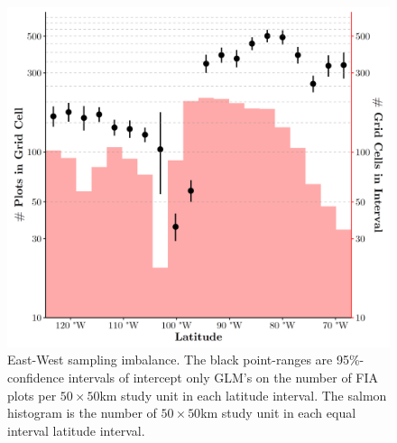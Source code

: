 \documentclass[
  10pt,
]{article}
\begin{document}
\begin{figure}
  \centering
  \includegraphics[width=\textwidth]{../Final Visualizations/eastWestSampling.png}
  \caption{East-West sampling imbalance. The black point-ranges are 95\%-confidence intervals of intercept only GLM's on the number of FIA plots per $50 \times 50$km study unit in each latitude interval. The salmon histogram is the number of $50 \times 50$km study unit in each equal interval latitude interval.}
  \label{fig:samplingImbalance}
\end{figure}
\end{document}
